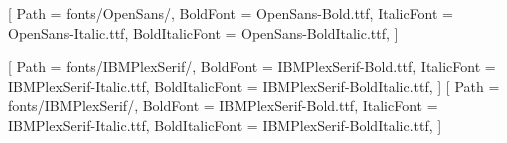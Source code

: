 %
%

%
%
%
%
%
\usepackage{fontspec}


\setsansfont{OpenSans-Regular.ttf}[
  Path           = fonts/OpenSans/,
  BoldFont       = OpenSans-Bold.ttf,
  ItalicFont     = OpenSans-Italic.ttf,
  BoldItalicFont = OpenSans-BoldItalic.ttf,
]
\renewcommand{\familydefault}{\sfdefault}

\setmainfont{IBMPlexSerif-Regular.ttf}[
  Path           = fonts/IBMPlexSerif/,
  BoldFont       = IBMPlexSerif-Bold.ttf,
  ItalicFont     = IBMPlexSerif-Italic.ttf,
  BoldItalicFont = IBMPlexSerif-BoldItalic.ttf,
]
\newfontfamily{}[
  Path           = fonts/IBMPlexSerif/,
  BoldFont       = IBMPlexSerif-Bold.ttf,
  ItalicFont     = IBMPlexSerif-Italic.ttf,
  BoldItalicFont = IBMPlexSerif-BoldItalic.ttf,
]

